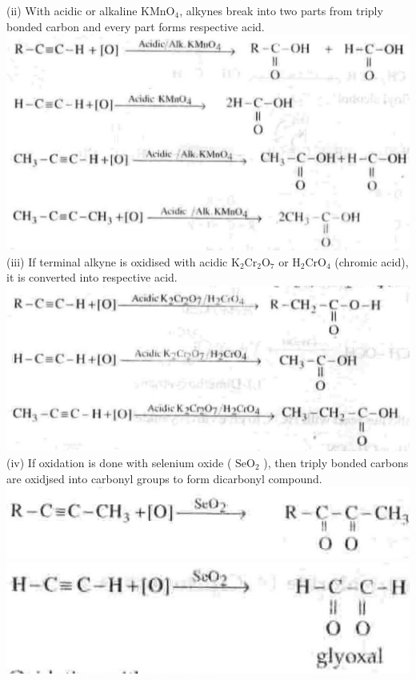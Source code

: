 \documentclass[10pt]{article}
\begin{document}
(ii) With acidic or alkaline $\mathrm{KMnO}_{4}$, alkynes break into two parts from triply bonded carbon and every part forms respective acid.\\
\includegraphics[max width=\textwidth, center]{2025_01_28_8470952b98110cec3aabg-192(11)}\\
(iii) If terminal alkyne is oxidised with acidic $\mathrm{K}_{2} \mathrm{Cr}_{2} \mathrm{O}_{7}$ or $\mathrm{H}_{2} \mathrm{CrO}_{4}$ (chromic acid), it is converted into respective acid.\\
\includegraphics[max width=\textwidth, center]{2025_01_28_8470952b98110cec3aabg-192(9)}\\
(iv) If oxidation is done with selenium oxide ( $\mathrm{SeO}_{2}$ ), then triply bonded carbons are oxidjsed into carbonyl groups to form dicarbonyl compound.\\
\includegraphics[max width=\textwidth, center]{2025_01_28_8470952b98110cec3aabg-192(3)}\\
\includegraphics[max width=\textwidth, center]{2025_01_28_8470952b98110cec3aabg-192(1)}\\
\end{document}
